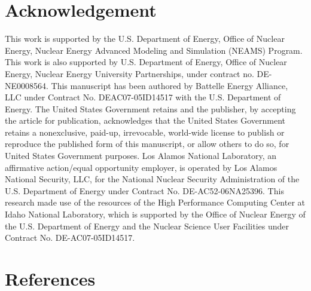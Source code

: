 \documentclass[review]{elsarticle}
\begin{document}
\section{Acknowledgement}
This work is supported by the U.S. Department of Energy, Office of Nuclear Energy, Nuclear Energy Advanced Modeling and Simulation (NEAMS) Program. This work is also supported by U.S. Department of Energy, Office of Nuclear Energy, Nuclear Energy University Partnerships, under contract no. DE-NE0008564. This manuscript has been authored by Battelle Energy Alliance, LLC under Contract No. DEAC07-05ID14517 with the U.S. Department of Energy. The United States Government retains and the publisher, by accepting the article for publication, acknowledges that the United States Government retains a nonexclusive, paid-up, irrevocable, world-wide license to publish or reproduce the published form of this manuscript, or allow others to do so, for United States Government purposes. Los Alamos National Laboratory, an affirmative action/equal opportunity employer, is operated by Los Alamos National Security, LLC, for the National Nuclear Security Administration of the U.S. Department of Energy under Contract No. DE-AC52-06NA25396. This research made use of the resources of the High Performance Computing Center at Idaho National Laboratory, which is supported by the Office of Nuclear Energy of the U.S. Department of Energy and the Nuclear Science User Facilities under Contract No. DE-AC07-05ID14517.

\section{References}


\end{document}
